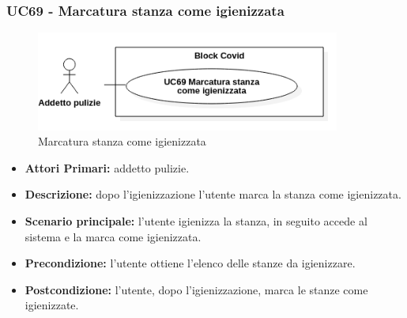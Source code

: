 \subsubsection{UC69 - Marcatura stanza come igienizzata}
\begin{figure}[H]
		\centering
		\includegraphics[width=10cm]{res/images/UC69.png}
		\caption{Marcatura stanza come igienizzata}
		\label{fig:Marcatura stanza come igienizzata}
	\end{figure}
\begin{itemize}
           	\item\textbf{Attori Primari:} addetto pulizie.
           	\item\textbf{Descrizione:} dopo l'igienizzazione l'utente marca la stanza come igienizzata.
           	\item\textbf{Scenario principale:} l'utente igienizza la stanza, in seguito accede al sistema e la marca come igienizzata.
           	\item\textbf{Precondizione:} l'utente ottiene l'elenco delle stanze da igienizzare.
           	\item\textbf{Postcondizione:} l'utente, dopo l'igienizzazione, marca le stanze come igienizzate.
\end{itemize}

